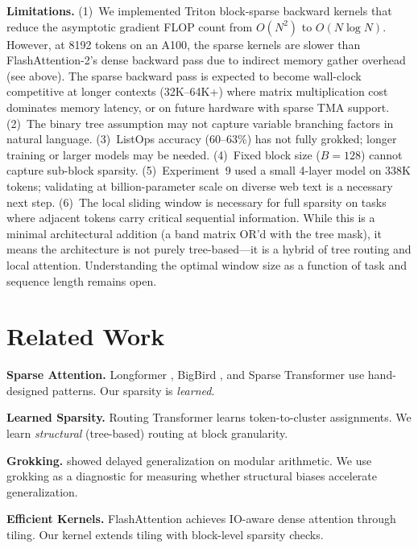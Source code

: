 \documentclass[11pt,a4paper]{article}
\begin{document}
\textbf{Limitations.} (1)~We implemented Triton block-sparse backward kernels that reduce the asymptotic gradient FLOP count from $O(N^2)$ to $O(N \log N)$. However, at 8192 tokens on an A100, the sparse kernels are slower than FlashAttention-2's dense backward pass due to indirect memory gather overhead (see above). The sparse backward pass is expected to become wall-clock competitive at longer contexts (32K--64K+) where matrix multiplication cost dominates memory latency, or on future hardware with sparse TMA support. (2)~The binary tree assumption may not capture variable branching factors in natural language. (3)~ListOps accuracy (60--63\%) has not fully grokked; longer training or larger models may be needed. (4)~Fixed block size ($B=128$) cannot capture sub-block sparsity. (5)~Experiment~9 used a small 4-layer model on 338K tokens; validating at billion-parameter scale on diverse web text is a necessary next step. (6)~The local sliding window is necessary for full sparsity on tasks where adjacent tokens carry critical sequential information. While this is a minimal architectural addition (a band matrix OR'd with the tree mask), it means the architecture is not purely tree-based---it is a hybrid of tree routing and local attention. Understanding the optimal window size as a function of task and sequence length remains open.

\section{Related Work}

\textbf{Sparse Attention.} Longformer \citep{beltagy2020longformer}, BigBird \citep{zaheer2020bigbird}, and Sparse Transformer \citep{child2019sparse} use hand-designed patterns. Our sparsity is \emph{learned}.

\textbf{Learned Sparsity.} Routing Transformer \citep{roy2021routing} learns token-to-cluster assignments. We learn \emph{structural} (tree-based) routing at block granularity.

\textbf{Grokking.} \citet{power2022grokking} showed delayed generalization on modular arithmetic. We use grokking as a diagnostic for measuring whether structural biases accelerate generalization.

\textbf{Efficient Kernels.} FlashAttention \citep{dao2022flashattention} achieves IO-aware dense attention through tiling. Our kernel extends tiling with block-level sparsity checks.
\end{document}
